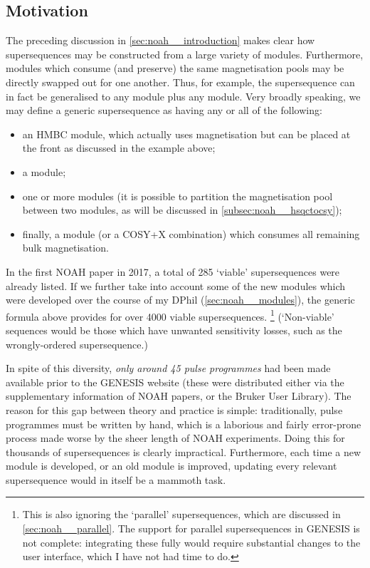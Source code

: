 \subsection{Motivation}
\label{subsec:noah__genesis_motivation}

The preceding discussion in \cref{sec:noah__introduction} makes clear how supersequences may be constructed from a large variety of modules.
Furthermore, modules which consume (and preserve) the same magnetisation pools may be directly swapped out for one another.
Thus, for example, the  supersequence can in fact be generalised to any  module plus any  module.
Very broadly speaking, we may define a generic supersequence as having any or all of the following:

\begin{itemize}
    \item an HMBC module, which actually uses  magnetisation but can be placed at the front as discussed in the  example above;
    \item a  module;
    \item one or more  modules (it is possible to partition the  magnetisation pool between two modules, as will be discussed in \cref{subsec:noah__hsqctocsy});
    \item finally, a  module (or a COSY+X combination) which consumes all remaining bulk magnetisation.
\end{itemize}

In the first NOAH paper in 2017\autocite{Kupce2017ACIE}, a total of 285 `viable' supersequences were already listed.
If we further take into account some of the new modules which were developed over the course of my DPhil (\cref{sec:noah__modules}), the generic formula above provides for over 4000 viable supersequences.%
\footnote{This is also ignoring the `parallel' supersequences, which are discussed in \cref{sec:noah__parallel}. The support for parallel supersequences in GENESIS is not complete: integrating these fully would require substantial changes to the user interface, which I have not had time to do.}
(`Non-viable' sequences would be those which have unwanted sensitivity losses, such as the wrongly-ordered  supersequence.)

In spite of this diversity, \textit{only around 45 pulse programmes} had been made available prior to the GENESIS website (these were distributed either via the supplementary information of NOAH papers, or the Bruker User Library).
The reason for this gap between theory and practice is simple: traditionally, pulse programmes must be written by hand, which is a laborious and fairly error-prone process made worse by the sheer length of NOAH experiments.
Doing this for thousands of supersequences is clearly impractical.
Furthermore, each time a new module is developed, or an old module is improved, updating every relevant supersequence would in itself be a mammoth task.

